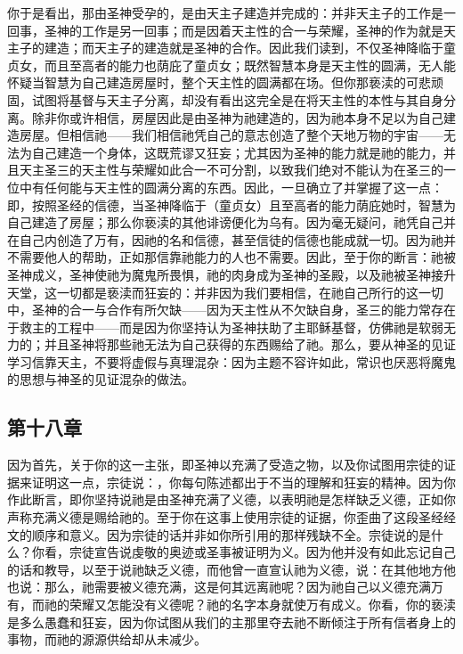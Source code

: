 你于是看出，那由圣神受孕的，是由天主子建造并完成的：并非天主子的工作是一回事，圣神的工作是另一回事；而是因着天主性的合一与荣耀，圣神的作为就是天主子的建造；而天主子的建造就是圣神的合作。因此我们读到，不仅圣神降临于童贞女，而且至高者的能力也荫庇了童贞女；既然智慧本身是天主性的圆满，无人能怀疑当智慧为自己建造房屋时，整个天主性的圆满都在场。但你那亵渎的可悲顽固，试图将基督与天主子分离，却没有看出这完全是在将天主性的本性与其自身分离。除非你或许相信，房屋因此是由圣神为祂建造的，因为祂本身不足以为自己建造房屋。但相信祂——我们相信祂凭自己的意志创造了整个天地万物的宇宙——无法为自己建造一个身体，这既荒谬又狂妄；尤其因为圣神的能力就是祂的能力，并且天主圣三的天主性与荣耀如此合一不可分割，以致我们绝对不能认为在圣三的一位中有任何能与天主性的圆满分离的东西。因此，一旦确立了并掌握了这一点：即，按照圣经的信德，当圣神降临于（童贞女）且至高者的能力荫庇她时，智慧为自己建造了房屋；那么你亵渎的其他诽谤便化为乌有。因为毫无疑问，祂凭自己并在自己内创造了万有，因祂的名和信德，甚至信徒的信德也能成就一切。因为祂并不需要他人的帮助，正如那信靠祂能力的人也不需要。因此，至于你的断言：祂被圣神成义，圣神使祂为魔鬼所畏惧，祂的肉身成为圣神的圣殿，以及祂被圣神接升天堂，这一切都是亵渎而狂妄的：并非因为我们要相信，在祂自己所行的这一切中，圣神的合一与合作有所欠缺——因为天主性从不欠缺自身，圣三的能力常存在于救主的工程中——而是因为你坚持认为圣神扶助了主耶稣基督，仿佛祂是软弱无力的；并且圣神将那些祂无法为自己获得的东西赐给了祂。那么，要从神圣的见证学习信靠天主，不要将虚假与真理混杂：因为主题不容许如此，常识也厌恶将魔鬼的思想与神圣的见证混杂的做法。\par


\subsection{第十八章}

\par

因为首先，关于你的这一主张，即圣神以充满了受造之物，以及你试图用宗徒的证据来证明这一点，宗徒说：，你每句陈述都出于不当的理解和狂妄的精神。因为你作此断言，即你坚持说祂是由圣神充满了义德，以表明祂是怎样缺乏义德，正如你声称充满义德是赐给祂的。至于你在这事上使用宗徒的证据，你歪曲了这段圣经经文的顺序和意义。因为宗徒的话并非如你所引用的那样残缺不全。宗徒说的是什么？你看，宗徒宣告说虔敬的奥迹或圣事被证明为义。因为他并没有如此忘记自己的话和教导，以至于说祂缺乏义德，而他曾一直宣认祂为义德，说：在其他地方他也说：那么，祂需要被义德充满，这是何其远离祂呢？因为祂自己以义德充满万有，而祂的荣耀又怎能没有义德呢？祂的名字本身就使万有成义。你看，你的亵渎是多么愚蠢和狂妄，因为你试图从我们的主那里夺去祂不断倾注于所有信者身上的事物，而祂的源源供给却从未减少。\par

